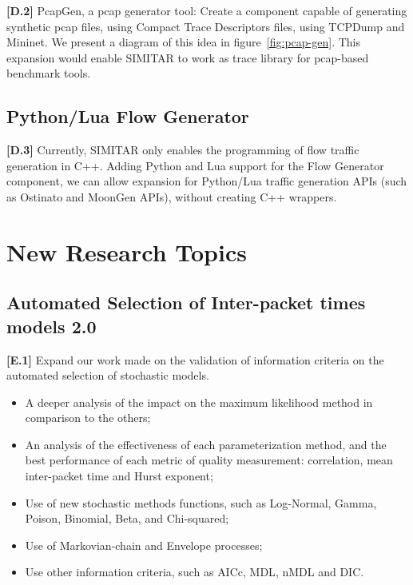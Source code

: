 \textbf{[D.2]} PcapGen, a pcap generator tool: Create a component capable of generating synthetic pcap files, using Compact Trace Descriptors files, using TCPDump\cite{web-tcpdump} and Mininet\cite{web-mininet}.  We present a diagram of this idea in figure~\ref{fig:pcap-gen}. This expansion would enable SIMITAR to work as trace library for pcap-based benchmark tools.

\subsection{Python/Lua Flow Generator}

\textbf{[D.3]} Currently, SIMITAR only enables the programming of flow traffic generation in C++. Adding Python and Lua support for the Flow Generator component, we can allow expansion for Python/Lua traffic generation APIs (such as Ostinato and MoonGen APIs), without creating C++ wrappers. 


\section{New Research Topics}


\subsection{Automated Selection of Inter-packet times models 2.0}

\textbf{[E.1]} Expand our work made on the validation of information criteria on the automated selection of stochastic models. 
\begin{itemize}
\item A deeper analysis of the impact on the maximum likelihood method in comparison to the others;
\item An analysis of the effectiveness of each parameterization method, and the best performance of each metric of quality measurement: correlation,  mean inter-packet time and Hurst exponent; 
\item Use of new stochastic methods functions, such as Log-Normal, Gamma, Poison, Binomial, Beta, and Chi-squared;
\item Use of Markovian-chain and Envelope processes;
\item Use other information criteria, such as \acrfull{AICc}, \acrfull{MDL}, \acrfull{nMDL}\cite{information-criteria} and \acrfull{DIC}\cite{dic-paper}.
\end{itemize}

